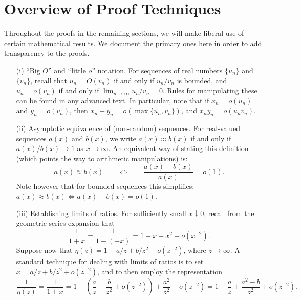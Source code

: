 \documentclass[11pt]{article}
\newcommand{\be}{\begin{equation}}
\newcommand{\ee}{\end{equation}}
\newcommand{\nc}{\normalcolor}
\begin{document}
\section{Overview of Proof Techniques}\label{app:prelim}
 Throughout the proofs
in the remaining sections, we will make liberal use of certain mathematical results. We document the primary ones here  in order to add transparency to the proofs.
\begin{itemize}
\item[(i)] ``Big $O$'' and ``little $o$'' notation. For sequences of real
  numbers $\{u_n\}$ and $\{v_n\}$, recall that $u_n=O(v_n)$ if and only if $u_n/v_n$ is bounded, and $u_n=o(v_n)$
  if and only if $\lim_{n\rightarrow\infty}u_n/v_n=0$. Rules for
  manipulating these can be found in any advanced text. In particular,
  note that if $x_n=o(u_n)$ and $y_n=o(v_n)$, then
  $x_n+y_n=o(\max\{u_n,v_n\})$, and $x_ny_n=o(u_nv_n)$.  

\item[(ii)] Asymptotic equivalence of (non-random) sequences. For
  real-valued sequences $a(x)$ and $b(x)$, we write $a(x)\approx b(x)$ if and only if
$a(x)/b(x)\rightarrow 1$ as $x \rightarrow\infty$. An equivalent way of
stating this definition (which points the way to  arithmetic
manipulations) is:
\[ a(x)\approx b(x) \qquad\Longleftrightarrow\qquad \frac{a(x)-b(x)}{a(x)}=o(1). \]
Note however that for bounded sequences this simplifies:
$a(x)\approx b(x)\Leftrightarrow a(x)-b(x)=o(1)$.

\item[(iii)] Establishing limits of ratios. For sufficiently small $x\downarrow 0$, recall from the
  geometric series expansion that
\[
\frac{1}{1+x} = \frac{1}{1-(-x)} = 1- x + x^2 + o(x^{-2}).
\]
Suppose now that $\eta(z)=1+a/z+b/z^2+o(z^{-2})$, where
$z\rightarrow\infty$. A standard technique for dealing with limits of
ratios is to set $x=a/z+b/z^2+o(z^{-2})$, and to then employ the representation
\be \label{our-common-trick}
\frac{1}{\eta(z)} = \frac{1}{1+x} =
1-\left(\frac{a}{z}+\frac{b}{z^2}+o(z^{-2})\right)
+\frac{a^2}{z^2}+o(z^{-2})
=
1-\frac{a}{z}+\frac{a^2-b}{z^2}+o(z^{-2}).  
\ee
\end{itemize}
\nc



\end{document}
